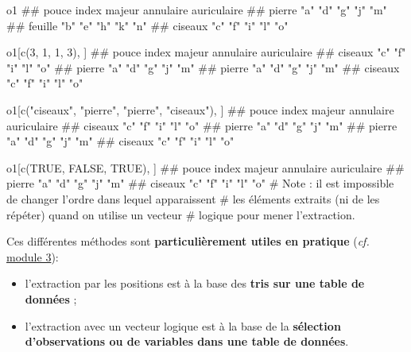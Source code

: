 \documentclass[12pt,twosided, notitlepage]{book}
\newenvironment{Shaded}{}{}
\newcommand{\CommentTok}[1]{\textcolor[rgb]{0.00,0.50,0.00}{#1}}
\newcommand{\DecValTok}[1]{#1}
\newcommand{\KeywordTok}[1]{\textcolor[rgb]{0.00,0.00,1.00}{#1}}
\newcommand{\NormalTok}[1]{#1}
\newcommand{\OtherTok}[1]{\textcolor[rgb]{1.00,0.25,0.00}{#1}}
\newcommand{\StringTok}[1]{\textcolor[rgb]{0.00,0.50,0.50}{#1}}
\providecommand{\tightlist}{%
  \setlength{\itemsep}{0pt}\setlength{\parskip}{0pt}}
\renewenvironment{Shaded}{\begin{snugshade}}{\end{snugshade}}
\begin{document}
\begin{Shaded}
\begin{Highlighting}[]
\NormalTok{o1}
\NormalTok{  ##         pouce index majeur annulaire auriculaire}
\NormalTok{  ## pierre  "a"   "d"   "g"    "j"       "m"        }
\NormalTok{  ## feuille "b"   "e"   "h"    "k"       "n"        }
\NormalTok{  ## ciseaux "c"   "f"   "i"    "l"       "o"}

\NormalTok{o1[}\KeywordTok{c}\NormalTok{(}\DecValTok{3}\NormalTok{, }\DecValTok{1}\NormalTok{, }\DecValTok{1}\NormalTok{, }\DecValTok{3}\NormalTok{), ]}
\NormalTok{  ##         pouce index majeur annulaire auriculaire}
\NormalTok{  ## ciseaux "c"   "f"   "i"    "l"       "o"        }
\NormalTok{  ## pierre  "a"   "d"   "g"    "j"       "m"        }
\NormalTok{  ## pierre  "a"   "d"   "g"    "j"       "m"        }
\NormalTok{  ## ciseaux "c"   "f"   "i"    "l"       "o"}


\NormalTok{o1[}\KeywordTok{c}\NormalTok{(}\StringTok{"ciseaux"}\NormalTok{, }\StringTok{"pierre"}\NormalTok{, }\StringTok{"pierre"}\NormalTok{, }\StringTok{"ciseaux"}\NormalTok{), ]}
\NormalTok{  ##         pouce index majeur annulaire auriculaire}
\NormalTok{  ## ciseaux "c"   "f"   "i"    "l"       "o"        }
\NormalTok{  ## pierre  "a"   "d"   "g"    "j"       "m"        }
\NormalTok{  ## pierre  "a"   "d"   "g"    "j"       "m"        }
\NormalTok{  ## ciseaux "c"   "f"   "i"    "l"       "o"}

\NormalTok{o1[}\KeywordTok{c}\NormalTok{(}\OtherTok{TRUE}\NormalTok{, }\OtherTok{FALSE}\NormalTok{, }\OtherTok{TRUE}\NormalTok{), ]}
\NormalTok{  ##         pouce index majeur annulaire auriculaire}
\NormalTok{  ## pierre  "a"   "d"   "g"    "j"       "m"        }
\NormalTok{  ## ciseaux "c"   "f"   "i"    "l"       "o"}
\CommentTok{# Note : il est impossible de changer l'ordre dans lequel apparaissent}
\CommentTok{# les éléments extraits (ni de les répéter) quand on utilise un vecteur}
\CommentTok{# logique pour mener l'extraction.}
\end{Highlighting}
\end{Shaded}

Ces différentes méthodes sont \textbf{particulièrement utiles en
pratique} (\emph{cf.} \underline{module 3}):

\begin{itemize}
\tightlist
\item
  l'extraction par les positions est à la base des \textbf{tris sur une
  table de données} ;
\item
  l'extraction avec un vecteur logique est à la base de la
  \textbf{sélection d'observations ou de variables dans une table de
  données}.
\end{itemize}
\end{document}
